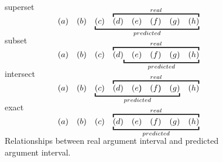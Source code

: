 \begin{figure}[ht]
\centering

superset
\vspace{0.2em}
{\large
\[
\begin{array}{*8{c}}
(a)&(b)&\underscope{predicted}{(c)&\overscope{real}{(d)&(e)&(f)&(g)&(h)}}
\end{array}
\]
}
\vspace{0.5em}

subset
\vspace{0.2em}
{\large
\[
\begin{array}{*8{c}}
(a)&(b)&(c)&\overscope{real}{(d)\underscope{predicted}{&(e)&(f)&(g)&(h)}}
\end{array}
\]
}
\vspace{0.5em}

intersect
\vspace{0.2em}
{\large
\[\def\arraystretch{0.0}
\begin{array}{*8{c}}
(a)&(b)&(c)&\overscope{real}{(d)&(e)&(f)&(g)&(h)}\\[-1em]
\hphantom{(a)}&\hphantom{(b)}&\underscope{predicted}
{\hphantom{(c)}&\hphantom{(d)}&\hphantom{(e})&\hphantom{(f})&
\hphantom{(g)}}&\hphantom{(h)}
\end{array}
\]
}
\vspace{0.5em}

exact
\vspace{0.2em}
{\large
\[
\begin{array}{*8{c}}
(a)&(b)&(c)&\underscope{predicted}{\overscope{real}{(d)&(e)&(f)&(g)&(h)}}
\end{array}
\]
}
\vspace{0.5em}

\caption{\label{i:args-relationship} Relationships between real argument interval
and predicted argument interval. }

\end{figure}
